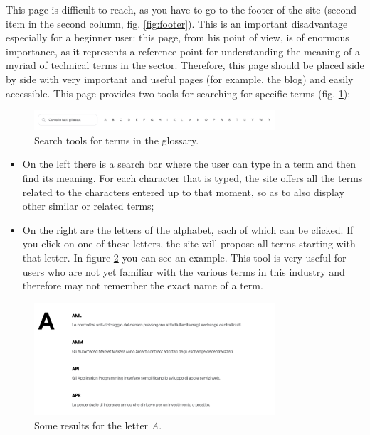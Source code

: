 This page is difficult to reach, as you have to go to the footer of the 
site (second item in the second column, fig. \ref{fig:footer}). This is an 
important disadvantage especially for a beginner user: this page, from his 
point of view, is of enormous importance, as it represents a reference 
point for understanding the meaning of a myriad of technical terms in the 
sector. Therefore, this page should be placed side by side with very 
important and useful pages (for example, the blog) and easily accessible. 
This page provides two tools for searching for specific terms (fig. 
\ref{fig:glossary-2}):

\begin{figure}[H]
  \centering
  \includegraphics[width=0.80\textwidth]{res/images/internal-pages/glossary/glossary-2.png}
  \caption{Search tools for terms in the glossary.}
  \label{fig:glossary-2}
\end{figure}

\begin{itemize}
  \item On the left there is a search bar where the user can type in a 
  term and then find its meaning. For each character that is typed, the 
  site offers all the terms related to the characters entered up to that 
  moment, so as to also display other similar or related terms;

  \item On the right are the letters of the alphabet, each of which can be 
  clicked. If you click on one of these letters, the site will propose all 
  terms starting with that letter. In figure \ref{fig:glossary-3} you can 
  see an example. This tool is very useful for users who are not yet 
  familiar with the various terms in this industry and therefore may not 
  remember the exact name of a term.
\end{itemize}

\begin{figure}[H]
  \centering
  \includegraphics[width=0.80\textwidth]{res/images/internal-pages/glossary/glossary-3.png}
  \caption{Some results for the letter \textit{A}.}
  \label{fig:glossary-3}
\end{figure}

